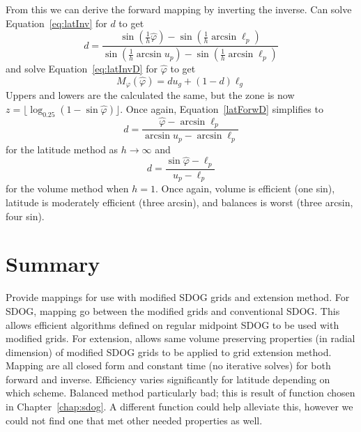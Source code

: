 From this we can derive the forward mapping by inverting the inverse.
Can solve Equation~\ref{eq:latInv} for $d$ to get
%
\begin{equation} \label{latForwD}
d = \frac{ \sin \left( \frac{1}{h} \hat{\varphi} \right) - \sin \left( \frac{1}{h} \arcsin \ell_p \right) }{ \sin \left( \frac{1}{h} \arcsin u_p \right) - \sin \left( \frac{1}{h} \arcsin \ell_p \right) }
\end{equation}
%
and solve Equation~\ref{eq:latInvD} for $\hat{\varphi}$ to get
%
\begin{equation} \label{eq:latForw}
M_\varphi (\hat{\varphi}) = d u_g + \left( 1 - d \right) \ell_g
\end{equation}
%
Uppers and lowers are the calculated the same, but the zone is now $z = \lfloor \log_{0.25} ( 1 - \sin \hat{\varphi} ) \rfloor$.
Once again, Equation~\ref{latForwD} simplifies to
%
\begin{equation*}
d = \frac{ \hat{\varphi} - \arcsin \ell_p }{ \arcsin u_p - \arcsin \ell_p}
\end{equation*}
%
for the latitude method as $h \rightarrow \infty$ and
%
\begin{equation*}
d = \frac{ \sin \hat{\varphi} - \ell_p }{ u_p - \ell_p }
\end{equation*}
%
for the volume method when $h = 1$.
Once again, volume is efficient (one sin), latitude is moderately efficient (three arcsin), and balances is worst (three arcsin, four sin).


\section{Summary}
Provide mappings for use with modified SDOG grids and extension method.
For SDOG, mapping go between the modified grids and conventional SDOG.
This allows efficient algorithms defined on regular midpoint SDOG to be used with modified grids.
For extension, allows same volume preserving properties (in radial dimension) of modified SDOG grids to be applied to grid extension method.
Mapping are all closed form and constant time (no iterative solves) for both forward and inverse.
Efficiency varies significantly for latitude depending on which scheme.
Balanced method particularly bad; this is result of function chosen in Chapter~\ref{chap:sdog}.
A different function could help alleviate this, however we could not find one that met other needed properties as well.
